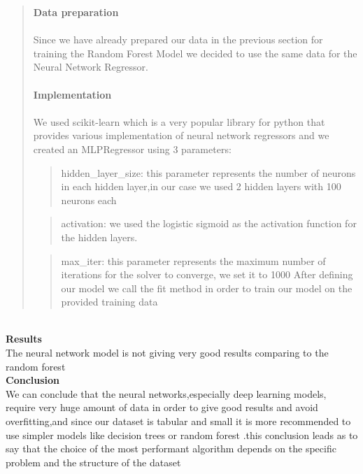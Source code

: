  \begin{quote}
\textbf{Data preparation}\\
\\
Since we have already prepared our data in the previous section for training the Random Forest Model we decided to use the same data for the Neural Network Regressor.\\
\\
\textbf{Implementation}\\
\\ 
We used scikit-learn which is a very popular library for python that provides various implementation of neural network regressors and we created an MLPRegressor using 3 parameters:\\
 \begin{quote}
hidden\_layer\_size: this parameter represents the number of neurons in each hidden layer,in our case we used 2 hidden layers with 100 neurons each\\
\end{quote}
 \begin{quote}
activation: we used the logistic sigmoid as the activation function for the hidden layers.\\
\end{quote}
 \begin{quote}
max\_iter: this parameter represents the maximum number of iterations for the solver to converge, we set it to 1000
After defining our model we call the fit method in order to train our model on the provided training data\\
\end{quote}
\end{quote}

\\
\noindent \textbf{Results}
\\
The neural network model is not giving very good results comparing to the random forest\\


\noindent \textbf{Conclusion}\\

\noindent We can conclude that the neural networks,especially deep learning models, require very huge amount of data in order to give good results and avoid overfitting,and since our dataset is tabular and small it is more recommended to use simpler models like decision trees or random forest .this conclusion leads as to say that the choice of the most performant algorithm depends on the specific problem and the structure of the dataset 


